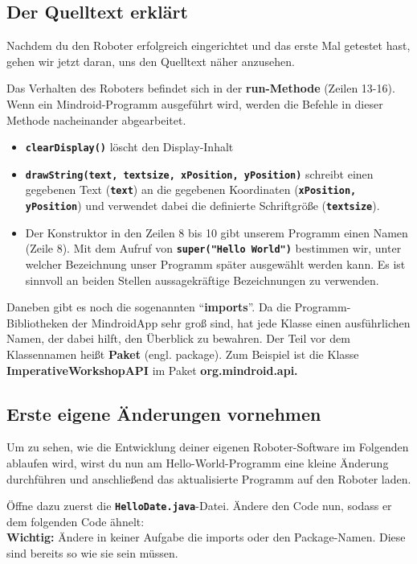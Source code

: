 \documentclass[
	12pt,
	colorbacktitle,
	accentcolor=tud1c,
	draft,
	twoside,
	german
]{tudexercise}
\newcommand{\solpath}[0]{../../impl/androidApp/app/src/main/java/org/mindroid/android/app/programs/workshop/solutions}
\newcommand{\bfcode}[1]{\texttt{\textbf{#1}}}
\begin{document}
	\subsection{Der Quelltext erklärt}
	Nachdem du den Roboter erfolgreich eingerichtet und das erste Mal getestet hast, gehen wir jetzt daran, uns den Quelltext näher anzusehen.
	
	Das Verhalten des Roboters befindet sich in der \textbf{run-Methode }(Zeilen 13-16). Wenn ein Mindroid-Programm ausgeführt wird, werden die Befehle in dieser Methode nacheinander abgearbeitet.
		\begin{itemize}
		\item{\bfcode{clearDisplay()}} löscht den Display-Inhalt
		\item{\bfcode{drawString(text, textsize, xPosition, yPosition)}} schreibt einen gegebenen Text (\bfcode{text}) an die gegebenen Koordinaten (\bfcode{xPosition, yPosition}) und verwendet dabei die definierte Schriftgröße (\bfcode{textsize}).
		\item Der Konstruktor in den Zeilen 8 bis 10 gibt unserem Programm einen Namen (Zeile 8). Mit dem Aufruf von \bfcode{super("Hello World")} bestimmen wir, unter welcher Bezeichnung unser Programm später ausgewählt werden kann. Es ist sinnvoll an beiden Stellen aussagekräftige Bezeichnungen zu verwenden.
		\end{itemize}
		Daneben gibt es noch die sogenannten “\textbf{imports}”. Da die Programm-Bibliotheken der MindroidApp sehr groß sind, hat jede Klasse einen ausführlichen Namen, der dabei hilft, den Überblick zu bewahren. Der Teil vor dem Klassennamen heißt \textbf{Paket} (engl. package). Zum Beispiel ist die Klasse \textbf{ImperativeWorkshopAPI} im Paket \textbf{org.mindroid.api.}
		
		\subsection{Erste eigene Änderungen vornehmen}
		Um zu sehen, wie die Entwicklung deiner eigenen Roboter-Software im Folgenden ablaufen wird, wirst du nun am Hello-World-Programm eine kleine Änderung durchführen und anschließend das aktualisierte Programm auf den Roboter laden.
		
		Öffne dazu zuerst die \bfcode{HelloDate.java}-Datei. Ändere den Code nun, sodass er dem folgenden Code ähnelt:\\
		\textbf{Wichtig:} Ändere in keiner Aufgabe die imports oder den Package-Namen. Diese sind bereits so wie sie sein müssen.
		
\end{document}
